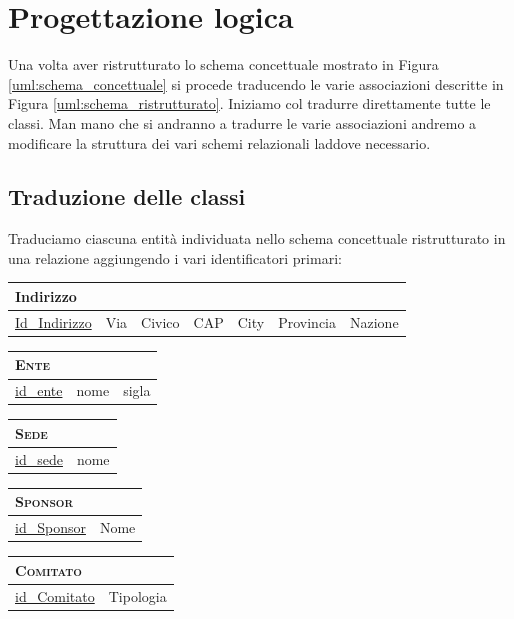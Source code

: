 \section{Progettazione logica}
Una volta aver ristrutturato lo schema concettuale mostrato in Figura \ref{uml:schema_concettuale} si procede traducendo le varie associazioni descritte in Figura \ref{uml:schema_ristrutturato}. Iniziamo col tradurre direttamente tutte le classi. Man mano che si andranno a tradurre le varie associazioni andremo a modificare la struttura dei vari schemi relazionali laddove necessario.
\subsection{Traduzione delle classi}
Traduciamo ciascuna entità individuata nello schema concettuale ristrutturato in una relazione aggiungendo i vari identificatori primari:

	\begin{tabular}{|l|l|l|l|l|l|l|}
		\multicolumn{7}{l}{Indirizzo} \\
		\hline
		\underline{Id\_Indirizzo} & Via & Civico & CAP & City & Provincia & Nazione \\ \hline
	\end{tabular}
	
	\begin{tabular}{|l|l|l|}
		\multicolumn{3}{l}{\textsc{Ente}}\\ \hline
		\underline{id\_ente} & nome & sigla \\ \hline
	\end{tabular}


	\begin{tabular}{|l|l|}
		\multicolumn{2}{l}{\textsc{Sede}} \\ \hline
		\underline{id\_sede} & nome \\ \hline
	\end{tabular}


	\begin{tabular}{|l|l|}
		\multicolumn{2}{l}{\textsc{Sponsor}} \\ \hline
		\underline{id\_Sponsor} & Nome \\ \hline
	\end{tabular}


	\begin{tabular}{|l|l|}
		\multicolumn{2}{l}{\textsc{Comitato}} \\ \hline
		\underline{id\_Comitato} & Tipologia \\ \hline
	\end{tabular}



